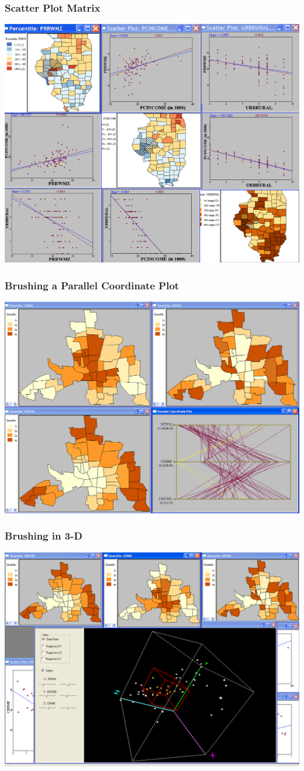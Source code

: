 \documentclass[nototal]{beamer}
\begin{document}
\begin{frame}
	\frametitle{Scatter Plot Matrix}
 \begin{center}
 \includegraphics[width=.85\linewidth]{spmatrix.png}
  \end{center}
 \end{frame} 

\begin{frame}
	\frametitle{Brushing a  Parallel Coordinate Plot}
 \begin{center}
 \includegraphics[width=.85\linewidth]{brushpcpgeoda.png}
  \end{center}
 \end{frame} 

\begin{frame}
	\frametitle{Brushing in 3-D}
 \begin{center}
 \includegraphics[width=.85\linewidth]{select3d.png}
  \end{center}
 \end{frame}
\end{document}
